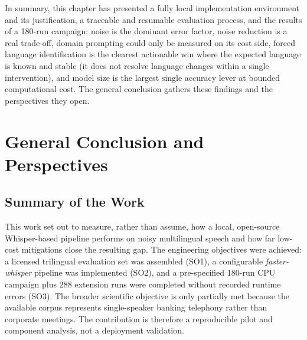 \documentclass[12pt]{report}
\begin{document}
\vspace{0.5em}
In summary, this chapter has presented a fully local implementation environment and its justification, a traceable and resumable evaluation process, and the results of a 180-run campaign: noise is the dominant error factor, noise reduction is a real trade-off, domain prompting could only be measured on its cost side, forced language identification is the clearest actionable win where the expected language is known and stable (it does not resolve language changes within a single intervention), and model size is the largest single accuracy lever at bounded computational cost. The general conclusion gathers these findings and the perspectives they open.
\chapter*{General Conclusion and Perspectives}
\thispagestyle{fancy}
{}
\section*{Summary of the Work}
This work set out to measure, rather than assume, how a local, open-source Whisper-based pipeline performs on noisy multilingual speech and how far low-cost mitigations close the resulting gap. The engineering objectives were achieved: a licensed trilingual evaluation set was assembled (SO1), a configurable \textit{faster-whisper} pipeline was implemented (SO2), and a pre-specified 180-run CPU campaign plus 288 extension runs were completed without recorded runtime errors (SO3). The broader scientific objective is only partially met because the available corpus represents single-speaker banking telephony rather than corporate meetings. The contribution is therefore a reproducible pilot and component analysis, not a deployment validation.
\end{document}
